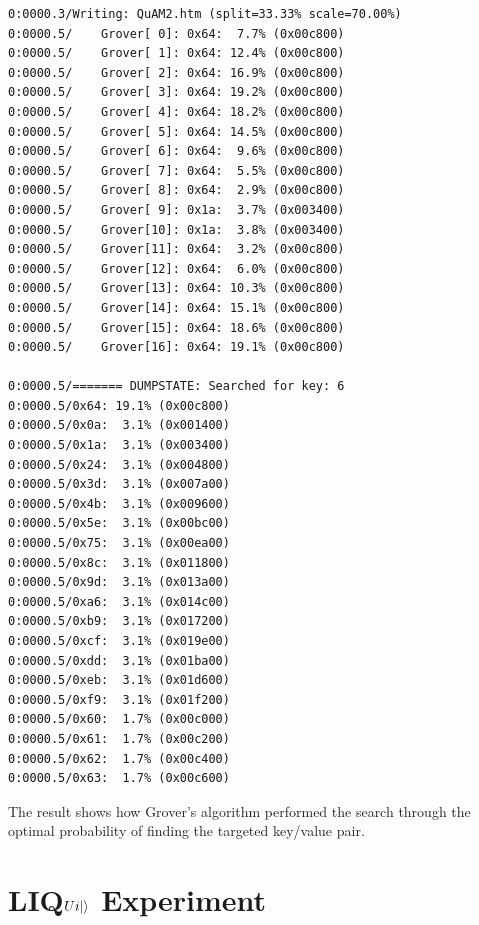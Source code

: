 \documentclass[12pt]{third-rep}
\begin{document}
\begin{verbatim}
0:0000.3/Writing: QuAM2.htm (split=33.33% scale=70.00%)
0:0000.5/    Grover[ 0]: 0x64:  7.7% (0x00c800)
0:0000.5/    Grover[ 1]: 0x64: 12.4% (0x00c800)
0:0000.5/    Grover[ 2]: 0x64: 16.9% (0x00c800)
0:0000.5/    Grover[ 3]: 0x64: 19.2% (0x00c800)
0:0000.5/    Grover[ 4]: 0x64: 18.2% (0x00c800)
0:0000.5/    Grover[ 5]: 0x64: 14.5% (0x00c800)
0:0000.5/    Grover[ 6]: 0x64:  9.6% (0x00c800)
0:0000.5/    Grover[ 7]: 0x64:  5.5% (0x00c800)
0:0000.5/    Grover[ 8]: 0x64:  2.9% (0x00c800)
0:0000.5/    Grover[ 9]: 0x1a:  3.7% (0x003400)
0:0000.5/    Grover[10]: 0x1a:  3.8% (0x003400)
0:0000.5/    Grover[11]: 0x64:  3.2% (0x00c800)
0:0000.5/    Grover[12]: 0x64:  6.0% (0x00c800)
0:0000.5/    Grover[13]: 0x64: 10.3% (0x00c800)
0:0000.5/    Grover[14]: 0x64: 15.1% (0x00c800)
0:0000.5/    Grover[15]: 0x64: 18.6% (0x00c800)
0:0000.5/    Grover[16]: 0x64: 19.1% (0x00c800)

0:0000.5/======= DUMPSTATE: Searched for key: 6
0:0000.5/0x64: 19.1% (0x00c800)
0:0000.5/0x0a:  3.1% (0x001400)
0:0000.5/0x1a:  3.1% (0x003400)
0:0000.5/0x24:  3.1% (0x004800)
0:0000.5/0x3d:  3.1% (0x007a00)
0:0000.5/0x4b:  3.1% (0x009600)
0:0000.5/0x5e:  3.1% (0x00bc00)
0:0000.5/0x75:  3.1% (0x00ea00)
0:0000.5/0x8c:  3.1% (0x011800)
0:0000.5/0x9d:  3.1% (0x013a00)
0:0000.5/0xa6:  3.1% (0x014c00)
0:0000.5/0xb9:  3.1% (0x017200)
0:0000.5/0xcf:  3.1% (0x019e00)
0:0000.5/0xdd:  3.1% (0x01ba00)
0:0000.5/0xeb:  3.1% (0x01d600)
0:0000.5/0xf9:  3.1% (0x01f200)
0:0000.5/0x60:  1.7% (0x00c000)
0:0000.5/0x61:  1.7% (0x00c200)
0:0000.5/0x62:  1.7% (0x00c400)
0:0000.5/0x63:  1.7% (0x00c600)
\end{verbatim}
The result shows how Grover's algorithm performed the search through the optimal probability of finding the targeted key/value pair.

\nocite{1402.4467}

\appendix

\titleformat{\chapter}{\normalfont\huge\bf}{\chaptertitlename \ \thechapter\ \ \ --}{20pt}{\huge\bf} 
\chapter{LIQ$Ui{\left\vert{}\right\rangle}$ Experiment}
\end{document}
